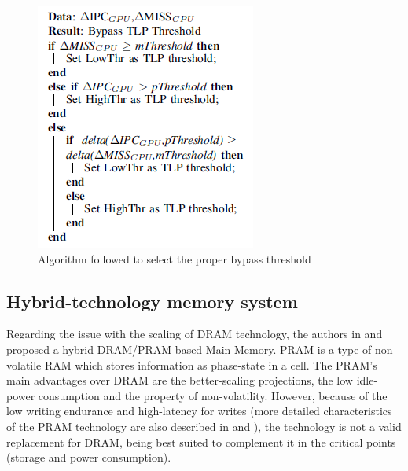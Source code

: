 \documentclass[journal]{IEEEtran}
\begin{document}
\begin{figure}
\centering
\includegraphics[width = 6 cm]{graphics/LLCalgo.png}
\caption{Algorithm followed to select the proper bypass threshold\cite{LLC}}\label{fig:algo}
\end{figure} 

\subsection{Hybrid-technology memory system}
Regarding the issue with the scaling of DRAM technology, the authors in \cite{PDRAM} and \cite{PRAM} proposed a hybrid DRAM/PRAM-based Main Memory. PRAM is a type of non-volatile RAM which stores information as phase-state in a cell. The PRAM’s main advantages over DRAM  are the better-scaling projections, the low idle-power consumption and the property of non-volatility. However, because of the low writing endurance and high-latency for writes (more detailed characteristics of the PRAM technology are also described in \cite{PDRAM} and \cite{PRAM}), the technology is not a valid replacement for DRAM, being best suited to complement it in the critical points (storage and power consumption).
\end{document}
